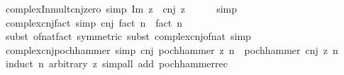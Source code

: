\begin{isabellebody}
\endisatagproof
{\isafoldproof}%
%
\isadelimproof
\isanewline
%
\endisadelimproof
\isanewline
{}\isamarkupfalse%
\ complex{\isacharunderscore}{\kern0pt}In{\isacharunderscore}{\kern0pt}mult{\isacharunderscore}{\kern0pt}cnj{\isacharunderscore}{\kern0pt}zero\ {\isacharbrackleft}{\kern0pt}simp{\isacharbrackright}{\kern0pt}{\isacharcolon}{\kern0pt}\ {\isachardoublequoteopen}Im\ {\isacharparenleft}{\kern0pt}z\ {\isacharasterisk}{\kern0pt}\ cnj\ z{\isacharparenright}{\kern0pt}\ {\isacharequal}{\kern0pt}\ {}{\isachardoublequoteclose}\isanewline
%
\isadelimproof
\ \ %
\endisadelimproof
%
\isatagproof
{}\isamarkupfalse%
\ simp%
\endisatagproof
{\isafoldproof}%
%
\isadelimproof
\isanewline
%
\endisadelimproof
\isanewline
{}\isamarkupfalse%
\ complex{\isacharunderscore}{\kern0pt}cnj{\isacharunderscore}{\kern0pt}fact\ {\isacharbrackleft}{\kern0pt}simp{\isacharbrackright}{\kern0pt}{\isacharcolon}{\kern0pt}\ {\isachardoublequoteopen}cnj\ {\isacharparenleft}{\kern0pt}fact\ n{\isacharparenright}{\kern0pt}\ {\isacharequal}{\kern0pt}\ fact\ n{\isachardoublequoteclose}\isanewline
%
\isadelimproof
\ \ %
\endisadelimproof
%
\isatagproof
{}\isamarkupfalse%
\ {\isacharparenleft}{\kern0pt}subst\ of{\isacharunderscore}{\kern0pt}nat{\isacharunderscore}{\kern0pt}fact\ {\isacharbrackleft}{\kern0pt}symmetric{\isacharbrackright}{\kern0pt}{\isacharcomma}{\kern0pt}\ subst\ complex{\isacharunderscore}{\kern0pt}cnj{\isacharunderscore}{\kern0pt}of{\isacharunderscore}{\kern0pt}nat{\isacharparenright}{\kern0pt}\ simp%
\endisatagproof
{\isafoldproof}%
%
\isadelimproof
\isanewline
%
\endisadelimproof
\isanewline
{}\isamarkupfalse%
\ complex{\isacharunderscore}{\kern0pt}cnj{\isacharunderscore}{\kern0pt}pochhammer\ {\isacharbrackleft}{\kern0pt}simp{\isacharbrackright}{\kern0pt}{\isacharcolon}{\kern0pt}\ {\isachardoublequoteopen}cnj\ {\isacharparenleft}{\kern0pt}pochhammer\ z\ n{\isacharparenright}{\kern0pt}\ {\isacharequal}{\kern0pt}\ pochhammer\ {\isacharparenleft}{\kern0pt}cnj\ z{\isacharparenright}{\kern0pt}\ n{\isachardoublequoteclose}\isanewline
%
\isadelimproof
\ \ %
\endisadelimproof
%
\isatagproof
{}\isamarkupfalse%
\ {\isacharparenleft}{\kern0pt}induct\ n\ arbitrary{\isacharcolon}{\kern0pt}\ z{\isacharparenright}{\kern0pt}\ {\isacharparenleft}{\kern0pt}simp{\isacharunderscore}{\kern0pt}all\ add{\isacharcolon}{\kern0pt}\ pochhammer{\isacharunderscore}{\kern0pt}rec{\isacharparenright}{\kern0pt}%
\endisatagproof
{\isafoldproof}%
%
\isadelimproof
\isanewline
%
\endisadelimproof
\isanewline
{}\isamarkupfalse%

\end{isabellebody}
